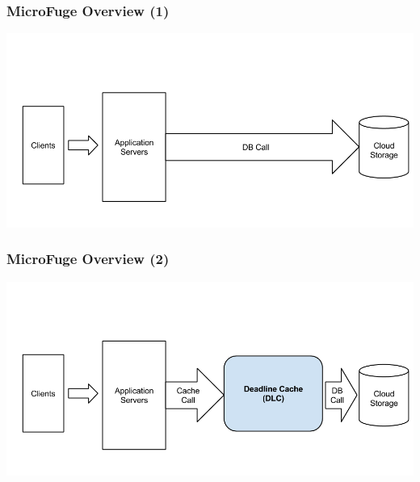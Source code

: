 \documentclass{beamer}
\begin{document}

\begin{frame}
  \frametitle{MicroFuge Overview (1)}
  \vspace{-10 mm}
  \begin{center}
  \includegraphics[scale=0.32]{img/MF_FULL_NEW_1.png}
  \end{center}
\end{frame}

\begin{frame}
  \frametitle{MicroFuge Overview (2)}
  \vspace{-10 mm}
  \begin{center}
  \includegraphics[scale=0.32]{img/MF_FULL_NEW_2.png}
  \end{center}
\end{frame}
\end{document}
